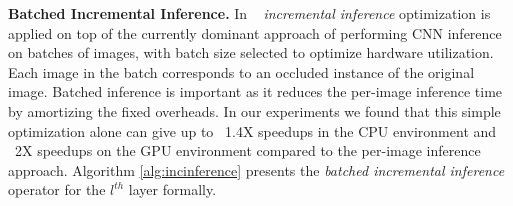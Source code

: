 \vspace{2mm}
\noindent \textbf{Batched Incremental Inference.} In \system~ \textit{incremental inference} optimization is applied on top of the currently dominant approach of performing CNN inference on batches of images, with batch size selected to optimize hardware utilization.
Each image in the batch corresponds to an occluded instance of the original image.
Batched inference is important as it reduces the per-image inference time by amortizing the fixed overheads.
In our experiments we found that this simple optimization alone can give up to ~1.4X speedups in the CPU environment and ~2X speedups on the GPU environment compared to the per-image inference approach.
Algorithm \ref{alg:incinference} presents the \textit{batched incremental inference} operator for the $l^{th}$ layer formally.


